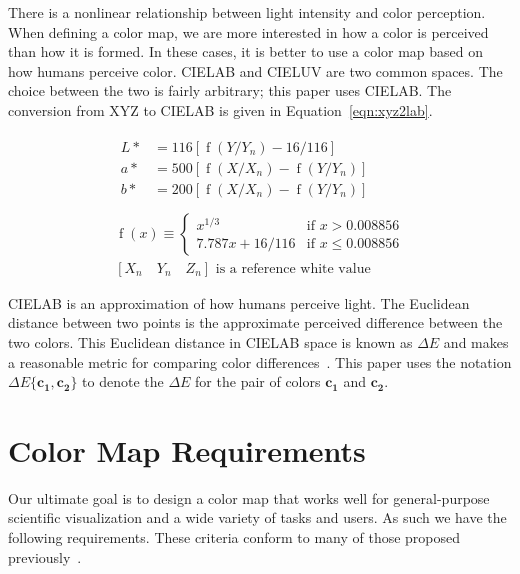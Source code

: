 \documentclass{acmsiggraph}               %
\newcommand{\lcite}[1]{~\cite{#1}}
\newcommand{\XYZ}{XYZ\xspace}
\newcommand{\Lab}{CIELAB\xspace}
\newcommand{\Luv}{CIELUV\xspace}
\newcommand{\DeltaE}{\ensuremath{\Delta{}E}\xspace}
\newcommand*{\cvec}[1]{\mathbf{#1}}
\begin{document}
There is a nonlinear relationship between light intensity and color
perception.  When defining a color map, we are more
interested in how a color is perceived than how it is formed.  In these
cases, it is better to use a color map based on how humans perceive color.
\Lab and \Luv are two common spaces.  The choice between the two is fairly
arbitrary; this paper uses \Lab.  The conversion from \XYZ to \Lab is given
in Equation~\ref{eqn:xyz2lab}.

\begin{equation}
  \begin{gathered}
    \begin{aligned}
      L* &= 116 \left[ \operatorname{f}(Y/Y_n) - 16/116 \right] \\
      a* &=
        500 \left[ \operatorname{f}(X/X_n) - \operatorname{f}(Y/Y_n) \right] \\
      b* &=
        200 \left[ \operatorname{f}(X/X_n) - \operatorname{f}(Y/Y_n) \right] \\
    \end{aligned} \\
    \operatorname{f}(x) \equiv
    \begin{cases}
      x^{1/3}          & \text{if $x > 0.008856$} \\
      7.787 x + 16/116 & \text{if $x \leq 0.008856$}
    \end{cases} \\
    [X_n \quad Y_n \quad Z_n] \text{ is a reference white value}
  \end{gathered}
  \label{eqn:xyz2lab}
\end{equation}

\Lab is an approximation of how humans perceive light.  The Euclidean
distance between two points is the approximate perceived difference between
the two colors.  This Euclidean distance in \Lab space is known as \DeltaE
and makes a reasonable metric for comparing color differences\lcite{Wyszecki82}.
This paper uses the notation $\DeltaE\{\cvec{c_1},\cvec{c_2}\}$ to denote
the \DeltaE for the pair of colors $\cvec{c_1}$ and $\cvec{c_2}$.


\section{Color Map Requirements}
\label{sec:ColorMapRequirements}

Our ultimate goal is to design a color map that works well for
general-purpose scientific visualization and a wide
variety of tasks and users.  As such we have the following requirements.
These criteria conform to many of those proposed
previously\lcite{Fortner97,Levkowitz92,Light04}.
\end{document}
